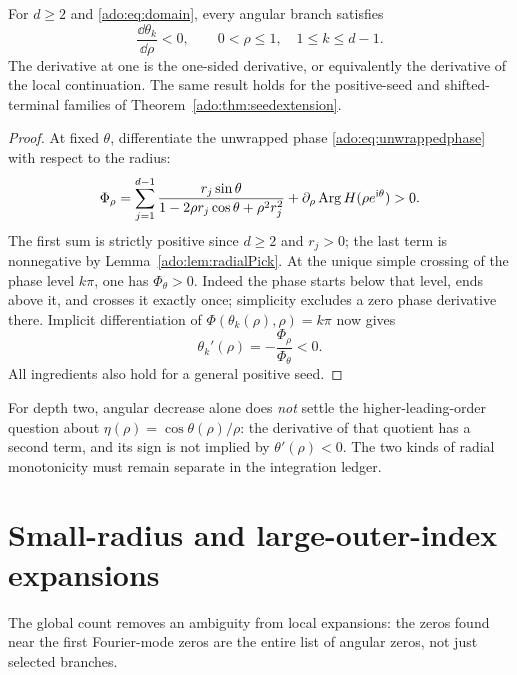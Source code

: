 \begin{theorem}
\label{ado:thm:radialmotion}
For $d\ge2$ and \eqref{ado:eq:domain}, every angular branch satisfies
\begin{equation}\label{ado:eq:strictmotion}
 \frac{\dd\theta_k}{\dd\rho}<0,
 \qquad 0<\rho\le1,\quad 1\le k\le d-1.
\end{equation}
The derivative at one is the one-sided derivative, or equivalently the
derivative of the local continuation. The same result holds for the
positive-seed and shifted-terminal families of
Theorem~\ref{ado:thm:seedextension}.
\end{theorem}
\begin{proof}
At fixed $\theta$, differentiate the unwrapped phase
\eqref{ado:eq:unwrappedphase} with respect to the radius:
\[
 \Phi_\rho
 =\sum_{j=1}^{d-1}
      \frac{r_j\sin\theta}{1-2\rho r_j\cos\theta+\rho^2r_j^2}
   +\partial_\rho\operatorname{Arg} H(\rho e^{\mathrm{i}\theta})>0.
\]
The first sum is strictly positive since $d\ge2$ and $r_j>0$; the
last term is nonnegative by Lemma~\ref{ado:lem:radialPick}.
At the unique simple crossing of the phase level $k\pi$, one has
$\Phi_\theta>0$. Indeed the phase starts below that level, ends
above it, and crosses it exactly once; simplicity excludes a zero
phase derivative there. Implicit differentiation of
$\Phi(\theta_k(\rho),\rho)=k\pi$ now gives
\[
 \theta_k'(\rho)=-\frac{\Phi_\rho}{\Phi_\theta}<0.
\]
All ingredients also hold for a general positive seed.
\end{proof}
For depth two, angular decrease alone does \emph{not} settle the
higher-leading-order question about $\eta(\rho)=\cos\theta(\rho)/\rho$: the derivative of that
quotient has a second term, and its sign is not implied by
$\theta'(\rho)<0$. The two kinds of radial monotonicity must remain
separate in the integration ledger.

\section{Small-radius and large-outer-index expansions}
\label{ado:sec:asymptotics}
The global count removes an ambiguity from local expansions: the zeros
found near the first Fourier-mode zeros are the entire list of angular
zeros, not just selected branches.

